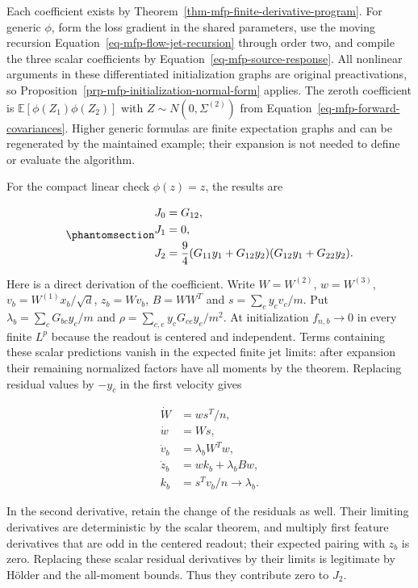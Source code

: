 \documentclass[
  11pt,
]{article}
\theoremstyle{definition}
\theoremstyle{plain}
\theoremstyle{plain}
\theoremstyle{plain}
\theoremstyle{remark}
\begin{document}
Each coefficient exists by
Theorem~\ref{thm-mfp-finite-derivative-program}. For generic \(\phi\),
form the loss gradient in the shared parameters, use the moving
recursion Equation~\ref{eq-mfp-flow-jet-recursion} through order two,
and compile the three scalar coefficients by
Equation~\ref{eq-mfp-source-response}. All nonlinear arguments in these
differentiated initialization graphs are original preactivations, so
Proposition~\ref{prp-mfp-initialization-normal-form} applies. The zeroth
coefficient is \(\mathbb E[\phi(Z_1)\phi(Z_2)]\) with
\(Z\sim N(0,\Sigma^{(2)})\) from
Equation~\ref{eq-mfp-forward-covariances}. Higher generic formulas are
finite expectation graphs and can be regenerated by the maintained
example; their expansion is not needed to define or evaluate the
algorithm.

For the compact linear check \(\phi(z)=z\), the results are

\begin{equation}\protect\phantomsection\label{eq-mfp-linear-kernel-jets}{
\begin{aligned}
J_0&=G_{12},\\
J_1&=0,\\
J_2&=\frac94(G_{11}y_1+G_{12}y_2)
                  (G_{12}y_1+G_{22}y_2).
\end{aligned}
}\end{equation}

Here is a direct derivation of the coefficient. Write \(W=W^{(2)}\),
\(w=W^{(3)}\), \(v_b=W^{(1)}x_b/\sqrt d\), \(z_b=Wv_b\), \(B=WW^T\) and
\(s=\sum_c y_cv_c/m\). Put \(\lambda_b=\sum_cG_{bc}y_c/m\) and
\(\rho=\sum_{c,e}y_cG_{ce}y_e/m^2\). At initialization \(f_{n,b}\to0\)
in every finite \(L^p\) because the readout is centered and independent.
Terms containing these scalar predictions vanish in the expected finite
jet limits: after expansion their remaining normalized factors have all
moments by the theorem. Replacing residual values by \(-y_c\) in the
first velocity gives

\[
\begin{aligned}
\dot W&=ws^T/n,\\
\dot w&=Ws,\\
\dot v_b&=\lambda_bW^Tw,\\
\dot z_b&=w k_b+\lambda_bBw,\\
k_b&=s^Tv_b/n\to\lambda_b.
\end{aligned}
\]

In the second derivative, retain the change of the residuals as well.
Their limiting derivatives are deterministic by the scalar theorem, and
multiply first feature derivatives that are odd in the centered readout;
their expected pairing with \(z_b\) is zero. Replacing these scalar
residual derivatives by their limits is legitimate by Hölder and the
all-moment bounds. Thus they contribute zero to \(J_2\).
\end{document}
